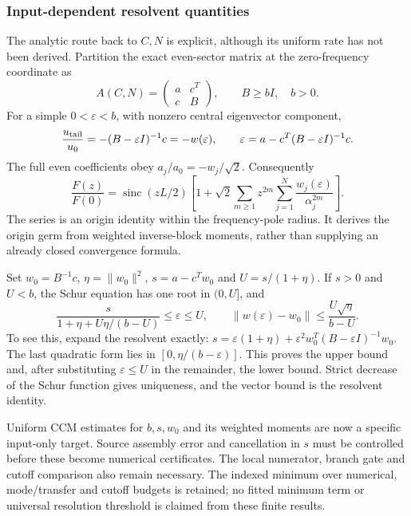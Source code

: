 \subsubsection{Input-dependent resolvent quantities}
The analytic route back to $C,N$ is explicit, although its uniform rate
has not been derived. Partition the exact even-sector matrix at the
zero-frequency coordinate as
\[
 A(C,N)=\begin{pmatrix}a&c^T\\c&B\end{pmatrix},\qquad B\ge bI,
 \quad b>0.
\]
For a simple $0<\varepsilon<b$, with nonzero central eigenvector component,
\[
 \frac{u_{\rm tail}}{u_0}=-(B-\varepsilon I)^{-1}c=-w(\varepsilon),
 \qquad \varepsilon=a-c^T(B-\varepsilon I)^{-1}c.
\]
The full even coefficients obey $a_j/a_0=-w_j/\sqrt2$. Consequently
\begin{equation}\label{eq:transfer-input-resolvent}
 \frac{F(z)}{F(0)}=\operatorname{sinc}(zL/2)
 \left[1+\sqrt2\sum_{m\ge1}z^{2m}
                         \sum_{j=1}^{N}\frac{w_j(\varepsilon)}{\alpha_j^{2m}}
 \right].
\end{equation}
The series is an origin identity within the frequency-pole radius.
It derives the origin germ from weighted inverse-block moments, rather
than supplying an already closed convergence formula.

Set $w_0=B^{-1}c$, $\eta=\|w_0\|^2$, $s=a-c^Tw_0$ and
$U=s/(1+\eta)$. If $s>0$ and $U<b$, the Schur equation has one root
in $(0,U]$, and
\begin{equation}\label{eq:transfer-schur-bracket}
 \frac{s}{1+\eta+U\eta/(b-U)}\le\varepsilon\le U,
 \qquad
 \|w(\varepsilon)-w_0\|\le\frac{U\sqrt\eta}{b-U}.
\end{equation}
To see this, expand the resolvent exactly:
$s=\varepsilon(1+\eta)+\varepsilon^2
w_0^T(B-\varepsilon I)^{-1}w_0$.
The last quadratic form lies in $[0,\eta/(b-\varepsilon)]$.
This proves the upper bound and, after substituting $\varepsilon\le U$
in the remainder, the lower bound. Strict decrease of the Schur function
gives uniqueness, and the vector bound is the resolvent identity.

Uniform CCM estimates for $b,s,w_0$ and its weighted moments are now a
specific input-only target. Source assembly error and cancellation in $s$
must be controlled before these become numerical certificates. The local
numerator, branch gate and cutoff comparison also remain necessary.
The indexed minimum over numerical, mode/transfer and cutoff budgets is
retained; no fitted minimum term or universal resolution threshold is
claimed from these finite results.
